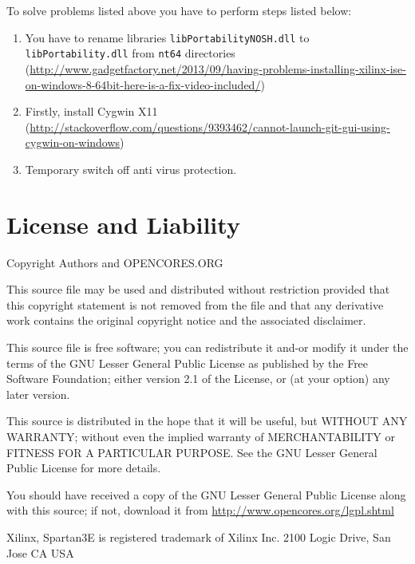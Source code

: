 \documentclass{gajewski}
\begin{document}
To solve problems listed above you have to perform steps listed below:
\begin{enumerate}
    \item You have to rename libraries \texttt{libPortabilityNOSH.dll} to \texttt{libPortability.dll} from \texttt{nt64} directories (\href{http://www.gadgetfactory.net/2013/09/having-problems-installing-xilinx-ise-on-windows-8-64bit-here-is-a-fix-video-included/}{http://www.gadgetfactory.net/2013/09/having-problems-installing-xilinx-ise-on-windows-8-64bit-here-is-a-fix-video-included/})
    \item Firstly, install Cygwin X11 (\href{http://stackoverflow.com/questions/9393462/cannot-launch-git-gui-using-cygwin-on-windows}{http://stackoverflow.com/questions/9393462/cannot-launch-git-gui-using-cygwin-on-windows})
    \item Temporary switch off anti virus protection.
\end{enumerate}

\newpage

\section{License and Liability}

Copyright  Authors and OPENCORES.ORG

This source file may be used and distributed without
restriction provided that this copyright statement is not
removed from the file and that any derivative work contains
the original copyright notice and the associated disclaimer.

This source file is free software; you can redistribute it
and-or modify it under the terms of the GNU Lesser General
Public License as published by the Free Software Foundation;
either version 2.1 of the License, or (at your option) any
later version.

This source is distributed in the hope that it will be
useful, but WITHOUT ANY WARRANTY; without even the implied
warranty of MERCHANTABILITY or FITNESS FOR A PARTICULAR
PURPOSE. See the GNU Lesser General Public License for more
details.

You should have received a copy of the GNU Lesser General
Public License along with this source; if not, download it
from \href{http://www.opencores.org/lgpl.shtml}{http://www.opencores.org/lgpl.shtml}

Xilinx, Spartan3E is registered trademark of Xilinx Inc. 2100 Logic Drive, San Jose CA USA

\newpage


\end{document}
